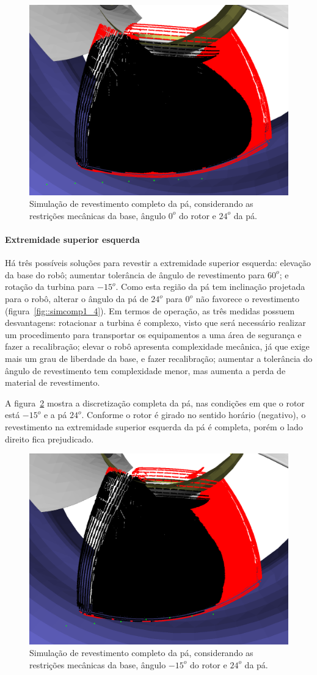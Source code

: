 \begin{figure}[!ht]
	\centering	
	\includegraphics[width=.5\columnwidth]{method/figs/simcomp1_1.png}
	\caption{Simulação de revestimento completo da pá, considerando as
	restrições mecânicas da base, ângulo $0^o$ do rotor e $24^o$ da pá.}
	\label{fig::simcomp1_1}
\end{figure}

\paragraph{Extremidade superior esquerda}
Há três possíveis soluções para revestir a extremidade superior esquerda:
elevação da base do robô; aumentar tolerância de ângulo de revestimento para
$60^o$; e rotação da turbina para $-15^o$. Como esta
região da pá tem inclinação projetada para o robô, alterar o ângulo da pá de $24^o$ para $0^o$ não favorece o
revestimento (figura~\ref{fig::simcomp1_4}). Em termos de operação, as três
medidas possuem desvantagens: rotacionar a turbina é complexo, visto que será
necessário realizar um procedimento para transportar os equipamentos a uma área
de segurança e fazer a recalibração; elevar o robô apresenta complexidade
mecânica, já que exige mais um grau de liberdade da base, e fazer recalibração;
aumentar a tolerância do ângulo de revestimento tem complexidade menor, mas
aumenta a perda de material de revestimento.

A figura~\ref{fig::simcomp1_5} mostra a discretização completa da pá, nas
condições em que o rotor está $-15^o$ e a pá $24^o$. Conforme o rotor é
girado no sentido horário (negativo), o revestimento na extremidade superior
esquerda da pá é completa, porém o lado direito fica prejudicado.

\begin{figure}[!ht]
	\centering	
	\includegraphics[width=.5\columnwidth]{method/figs/simcomp1_5.png}
	\caption{Simulação de revestimento completo da pá, considerando as
	restrições mecânicas da base, ângulo $-15^o$ do rotor e $24^o$ da pá.}
	\label{fig::simcomp1_5}
\end{figure}

